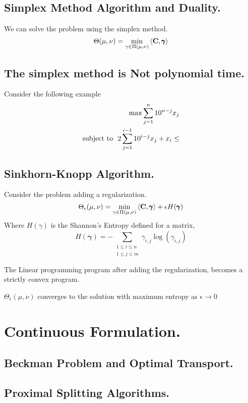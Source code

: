 \subsection{Simplex Method Algorithm and Duality.}
We can solve the problem using the simplex method.
\begin{equation}
	\Theta(\mu, \nu)=\min_{\gamma\in \Pi(\mu, \nu)}{\left\langle \mathbf{C}, \pmb{\gamma} \right\rangle}
\end{equation}
\subsection{The simplex method is Not polynomial time.}
Consider the following example
\begin{align}
	\max \sum_{j=1}^{n} 10^{n-j}x_j\\
	\text{subject to }\ 2\sum_{j=1}^{i-1}10^{i-j}x_j+x_i \leq 
\end{align}

\subsection{Sinkhorn-Knopp Algorithm.}
Consider the problem adding a regularization.
\begin{equation}
	\Theta_\epsilon(\mu, \nu)=\min_{\gamma\in \Pi(\mu, \nu)}{\left\langle \mathbf{C},\pmb{\gamma} \right\rangle+\epsilon H(\pmb{\gamma})}
\end{equation}
Where $H(\gamma)$ is the Shannon's Entropy defined for a matrix,
\begin{equation}
	H(\pmb{\gamma})=-\sum_{\substack{1\leq i \leq n\\ 1\leq j \leq m}}\gamma_{i,j}\log(\gamma_{i,j})
\end{equation} 

\begin{theorem}
	The Linear programming program after adding the regularization, becomes a strictly convex program.
\end{theorem}
\begin{theorem}
	$\Theta_\epsilon(\mu, \nu)$ converges to the solution with maximum entropy as $\epsilon\rightarrow 0$
\end{theorem}
\section{Continuous Formulation.}
\subsection{Beckman Problem and Optimal Transport.}
\subsection{Proximal Splitting Algorithms.}

